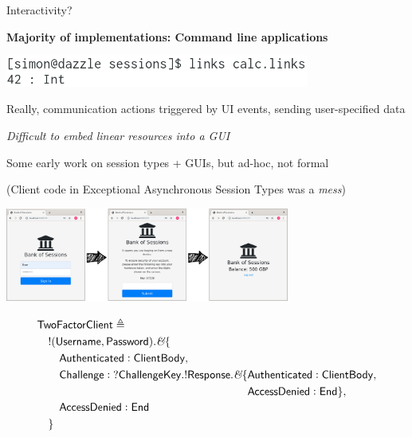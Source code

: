 \documentclass[11.5pt, aspectratio=169]{beamer}
\begin{document}
\begin{frame}{Interactivity?}

  \begin{fullpageitemize}
  \item {\Large \textbf{Majority of implementations: Command line applications}}
  \end{fullpageitemize}
  \vspace{-1em}
  \begin{center}
    \includegraphics[width=0.75\textwidth]{images/batch-prog.png}
  \end{center}
  \vspace{1.5em}

  \begin{fullpageitemize}
    \item Really, communication actions triggered by UI events, sending user-specified data
    \item \emph{Difficult to embed linear resources into a GUI}
    \item Some early work on session types + GUIs, but ad-hoc, not formal
      \begin{itemize}
        \itemR (Client code in Exceptional Asynchronous Session Types was a \emph{mess})
      \end{itemize}
  \end{fullpageitemize}
\end{frame}

\begin{frame}[plain]
  \begin{center}
    \includegraphics[width=0.7\textwidth]{images/2fa.png}
  \end{center}
  \pause

\[
    \def\arraystretch{1.25}
\bl
  \metadef{TwoFactorClient} \defeq \\
  \quad\gvoutone{(\mkwd{Username}, \mkwd{Password})} . \textit{\&} \{ \\
  \qquad \mkwd{Authenticated}: \metadef{ClientBody}, \\
  \qquad \mkwd{Challenge}: \gvinone{\mkwd{ChallengeKey}} .
    \gvoutone{\mkwd{Response}} . \textit{\&} \{
    \begin{aligned}[t]
      & \mkwd{Authenticated}: \metadef{ClientBody}, \\
    & \mkwd{AccessDenied}: \gvend \},
    \end{aligned} \\
  \qquad \mkwd{AccessDenied}: \gvend \\
  \quad \}
\el
\]

\end{frame}
\end{document}
